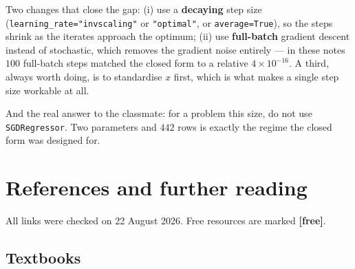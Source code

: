 \documentclass[11pt]{article}
\begin{document}
Two changes that close the gap: (i) use a \textbf{decaying} step size
(\texttt{learning\_rate="invscaling"} or \texttt{"optimal"}, or
\texttt{average=True}), so the steps shrink as the iterates approach the
optimum; (ii) use \textbf{full-batch} gradient descent instead of stochastic,
which removes the gradient noise entirely --- in these notes $100$ full-batch
steps matched the closed form to a relative $4\times10^{-16}$. A third, always
worth doing, is to standardise $x$ first, which is what makes a single step
size workable at all.

And the real answer to the classmate: for a problem this size, do not use
\texttt{SGDRegressor}. Two parameters and $442$ rows is exactly the regime the
closed form was designed for.

\section{References and further reading}

All links were checked on 22 August 2026. Free resources are marked
\textbf{[free]}.

\subsection*{Textbooks}
\end{document}
